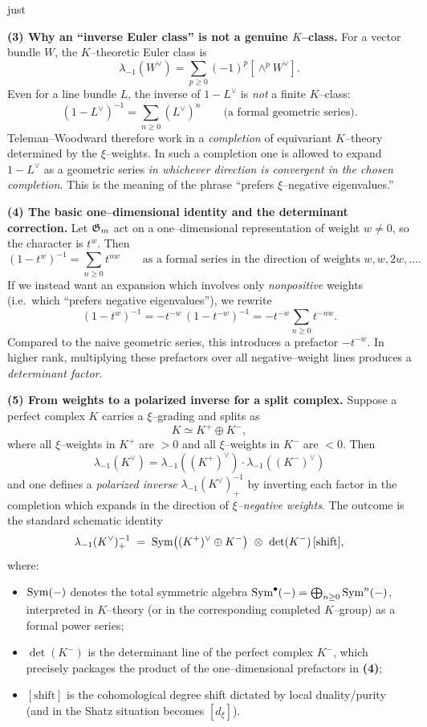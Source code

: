 just \documentclass[12pt]{article}
\begin{document}
\medskip
\noindent\textbf{(3) Why an ``inverse Euler class'' is not a genuine $K$--class.}
For a vector bundle $W$, the $K$--theoretic Euler class is
\[
\lambda_{-1}(W^\vee)=\sum_{p\ge 0}(-1)^p[\wedge^p W^\vee].
\]
Even for a line bundle $L$, the inverse of $1-L^\vee$ is \emph{not} a finite $K$--class:
\[
(1-L^\vee)^{-1} = \sum_{n\ge 0}(L^\vee)^n
\qquad\text{(a formal geometric series).}
\]
Teleman--Woodward therefore work in a \emph{completion} of equivariant $K$--theory
determined by the $\xi$--weights.  In such a completion one is allowed to expand
$1-L^\vee$ as a geometric series \emph{in whichever direction is convergent in the chosen
completion}.  This is the meaning of the phrase ``prefers $\xi$--negative eigenvalues.''

\medskip
\noindent\textbf{(4) The basic one--dimensional identity and the determinant correction.}
Let $\mathfrak{G}_m$ act on a one--dimensional representation of weight $w\neq 0$, so the character is $t^w$.
Then
\[
(1-t^w)^{-1}
=
\sum_{n\ge 0} t^{nw}
\qquad\text{as a formal series in the direction of weights }w,w,2w,\dots.
\]
If we instead want an expansion which involves only \emph{nonpositive} weights (i.e.\ which
``prefers negative eigenvalues''), we rewrite
\[
(1-t^w)^{-1} = -t^{-w}\,(1-t^{-w})^{-1}
= -t^{-w}\sum_{n\ge 0} t^{-nw}.
\]
Compared to the naive geometric series, this introduces a prefactor $-t^{-w}$.
In higher rank, multiplying these prefactors over all negative--weight lines produces a
\emph{determinant factor}. 

\medskip
\noindent\textbf{(5) From weights to a polarized inverse for a split complex.}
Suppose a perfect complex $K$ carries a $\xi$--grading and splits as
\[
K \simeq K^+ \oplus K^-,
\]
where all $\xi$--weights in $K^+$ are $>0$ and all $\xi$--weights in $K^-$ are $<0$.
Then \[\lambda_{-1}(K^\vee)=\lambda_{-1}((K^+)^\vee)\cdot \lambda_{-1}((K^-)^\vee)\]
and one defines a \emph{polarized inverse} $\lambda_{-1}(K^\vee)^{-1}_+$ by inverting
each factor in the completion which expands in the direction of \emph{$\xi$--negative weights}.
The outcome is the standard schematic identity
\begin{equation}
\label{eq:polarized-euler}
\lambda_{-1}(K^\vee)^{-1}_+
\;=\;
\Sym\bigl((K^+)^\vee \oplus K^-\bigr)\ \otimes\ \det(K^-)\,[\mathrm{shift}],
\end{equation}
where:
\begin{itemize}
\item $\operatorname{Sym}(-)$ denotes the total symmetric algebra
$\operatorname{Sym}^\bullet(-)=\bigoplus_{n\ge 0}\operatorname{Sym}^n(-)$, interpreted in $K$--theory (or in the
corresponding completed $K$--group) as a formal power series;
\item $\det(K^-)$ is the determinant line of the perfect complex $K^-$, which precisely
packages the product of the one--dimensional prefactors in \textbf{(4)};
\item $[\mathrm{shift}]$ is the cohomological degree shift dictated by local duality/purity
(and in the Shatz situation becomes $[d_\xi]$).
\end{itemize}
\end{document}
